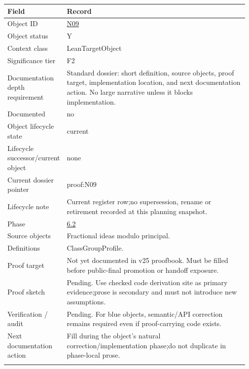 \begin{longtable}{L{0.16\linewidth} L{0.81\linewidth}}
\hline
\textbf{Field} & \textbf{Record}\\
\hline
Object ID & \hyperlink{object-row-N09}{N09}\\
\hline\addlinespace[0.20em]
Object status & Y\\
\hline\addlinespace[0.20em]
Context class & LeanTargetObject\\
\hline\addlinespace[0.20em]
Significance tier & F2\\
\hline\addlinespace[0.20em]
Documentation depth requirement & Standard dossier: short definition, source objects, proof target, implementation location, and next documentation action. No large narrative unless it blocks implementation.\\
\hline\addlinespace[0.20em]
Documented & no\\
\hline\addlinespace[0.20em]
Object lifecycle state & current\\
\hline\addlinespace[0.20em]
Lifecycle successor/\allowbreak{}current object & none\\
\hline\addlinespace[0.20em]
Current dossier pointer & proof:N09\\
\hline\addlinespace[0.20em]
Lifecycle note & Current register row;\newline no supersession, rename or retirement recorded at this planning snapshot.\\
\hline\addlinespace[0.20em]
Phase & \hyperlink{phase-row-6-2}{6.2}\\
\hline\addlinespace[0.20em]
Source objects & Fractional ideas modulo principal.\\
\hline\addlinespace[0.20em]
Definitions & ClassGroupProfile.\\
\hline\addlinespace[0.20em]
Proof target & Not yet documented in v25 proofbook. Must be filled before public-final promotion or handoff exposure.\\
\hline\addlinespace[0.20em]
Proof sketch & Pending. Use checked code derivation site as primary evidence;\newline prose is secondary and must not introduce new assumptions.\\
\hline\addlinespace[0.20em]
Verification /\allowbreak{} audit & Pending. For blue objects, semantic/\allowbreak{}API correction remains required even if proof-carrying code exists.\\
\hline\addlinespace[0.20em]
Next documentation action & Fill during the object's natural correction/\allowbreak{}implementation phase;\newline do not duplicate in phase-local prose.\\
\hline\addlinespace[0.20em]
\end{longtable}
